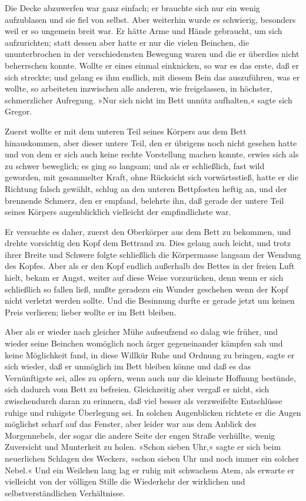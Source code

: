 Die Decke abzuwerfen war ganz einfach; er brauchte sich nur ein wenig
aufzublasen und sie fiel von selbst. Aber weiterhin wurde es schwierig,
besonders weil er so ungemein breit war. Er hätte Arme und Hände
gebraucht, um sich aufzurichten; statt dessen aber hatte er nur die
vielen Beinchen, die ununterbrochen in der verschiedensten Bewegung
waren und die er überdies nicht beherrschen konnte. Wollte er eines
einmal einknicken, so war es das erste, daß er sich streckte; und gelang
es ihm endlich, mit diesem Bein das auszuführen, was er wollte, so
arbeiteten inzwischen alle anderen, wie freigelassen, in höchster,
schmerzlicher Aufregung. »Nur sich nicht im Bett unnütz aufhalten,«
sagte sich Gregor.

Zuerst wollte er mit dem unteren Teil seines Körpers aus dem Bett
hinauskommen, aber dieser untere Teil, den er übrigens noch nicht
gesehen hatte und von dem er sich auch keine rechte Vorstellung machen
konnte, erwies sich als zu schwer beweglich; es ging so langsam; und als
er schließlich, fast wild geworden, mit gesammelter Kraft, ohne
Rücksicht sich vorwärtsstieß, hatte er die Richtung falsch gewählt,
schlug an den unteren Bettpfosten heftig an, und der brennende Schmerz,
den er empfand, belehrte ihn, daß gerade der untere Teil seines Körpers
augenblicklich vielleicht der empfindlichste war.

Er versuchte es daher, zuerst den Oberkörper aus dem Bett zu bekommen,
und drehte vorsichtig den Kopf dem Bettrand zu. Dies gelang auch leicht,
und trotz ihrer Breite und Schwere folgte schließlich die Körpermasse
langsam der Wendung des Kopfes. Aber als er den Kopf endlich außerhalb
des Bettes in der freien Luft hielt, bekam er Angst, weiter auf diese
Weise vorzurücken, denn wenn er sich schließlich so fallen ließ, mußte
geradezu ein Wunder geschehen wenn der Kopf nicht verletzt werden
sollte. Und die Besinnung durfte er gerade jetzt um keinen Preis
verlieren; lieber wollte er im Bett bleiben.

Aber als er wieder nach gleicher Mühe aufseufzend so dalag wie früher,
und wieder seine Beinchen womöglich noch ärger gegeneinander kämpfen sah
und keine Möglichkeit fand, in diese Willkür Ruhe und Ordnung zu
bringen, sagte er sich wieder, daß er unmöglich im Bett bleiben könne
und daß es das Vernünftigste sei, alles zu opfern, wenn auch nur die
kleinste Hoffnung bestünde, sich dadurch vom Bett zu befreien.
Gleichzeitig aber vergaß er nicht, sich zwischendurch daran zu erinnern,
daß viel besser als verzweifelte Entschlüsse ruhige und ruhigste
Überlegung sei. In solchen Augenblicken richtete er die Augen möglichst
scharf auf das Fenster, aber leider war aus dem Anblick des
Morgennebels, der sogar die andere Seite der engen Straße verhüllte,
wenig Zuversicht und Munterkeit zu holen. »Schon sieben Uhr,« sagte er
sich beim neuerlichen Schlagen des Weckers, »schon sieben Uhr und noch
immer ein solcher Nebel.« Und ein Weilchen lang lag er ruhig mit
schwachem Atem, als erwarte er vielleicht von der völligen Stille die
Wiederkehr der wirklichen und selbstverständlichen Verhältnisse.

